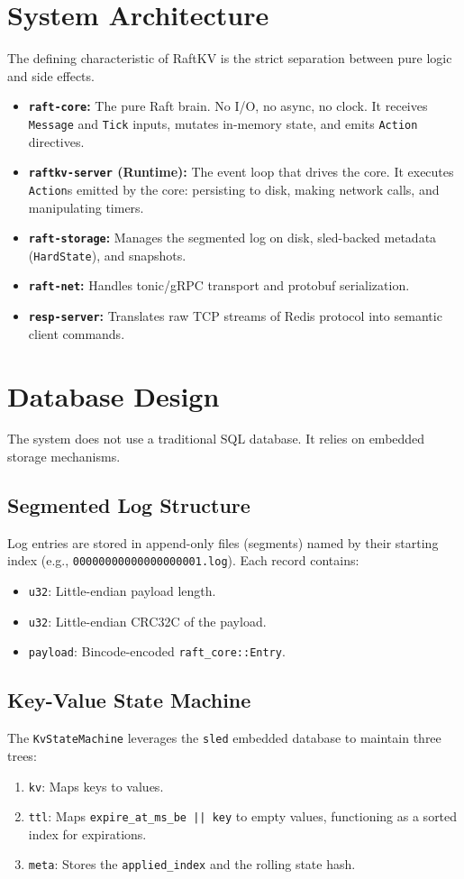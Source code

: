\documentclass[12pt,a4paper]{report}
\begin{document}
\section{System Architecture}
The defining characteristic of RaftKV is the strict separation between pure logic and side effects.
\begin{itemize}
    \item \textbf{\texttt{raft-core}:} The pure Raft brain. No I/O, no async, no clock. It receives \texttt{Message} and \texttt{Tick} inputs, mutates in-memory state, and emits \texttt{Action} directives.
    \item \textbf{\texttt{raftkv-server} (Runtime):} The event loop that drives the core. It executes \texttt{Action}s emitted by the core: persisting to disk, making network calls, and manipulating timers.
    \item \textbf{\texttt{raft-storage}:} Manages the segmented log on disk, sled-backed metadata (\texttt{HardState}), and snapshots.
    \item \textbf{\texttt{raft-net}:} Handles tonic/gRPC transport and protobuf serialization.
    \item \textbf{\texttt{resp-server}:} Translates raw TCP streams of Redis protocol into semantic client commands.
\end{itemize}

\section{Database Design}
The system does not use a traditional SQL database. It relies on embedded storage mechanisms.
\subsection{Segmented Log Structure}
Log entries are stored in append-only files (segments) named by their starting index (e.g., \texttt{00000000000000000001.log}).
Each record contains:
\begin{itemize}
    \item \texttt{u32}: Little-endian payload length.
    \item \texttt{u32}: Little-endian CRC32C of the payload.
    \item \texttt{payload}: Bincode-encoded \texttt{raft\_core::Entry}.
\end{itemize}
\subsection{Key-Value State Machine}
The \texttt{KvStateMachine} leverages the \texttt{sled} embedded database to maintain three trees:
\begin{enumerate}
    \item \texttt{kv}: Maps keys to values.
    \item \texttt{ttl}: Maps \texttt{expire\_at\_ms\_be || key} to empty values, functioning as a sorted index for expirations.
    \item \texttt{meta}: Stores the \texttt{applied\_index} and the rolling state hash.
\end{enumerate}
\end{document}
